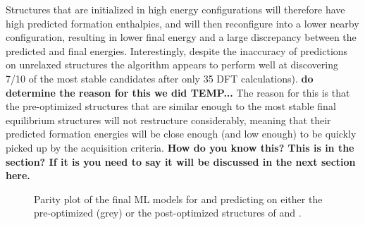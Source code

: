 %
Structures that are initialized in high energy configurations will therefore have high predicted formation enthalpies, and will then reconfigure into a lower nearby configuration, resulting in lower final energy and a large discrepancy between the predicted and final energies.
%
Interestingly, despite the inaccuracy of predictions on unrelaxed structures the algorithm appears to perform well at discovering \num{7/10} of the most stable candidates after only \num{35} DFT calculations). \textbf{do determine the reason for this we did TEMP...}
%
The reason for this is that the pre-optimized structures that are similar enough to the most stable final equilibrium structures will not restructure considerably, meaning that their predicted formation energies will be close enough (and low enough) to be quickly picked up by the acquisition criteria. \textbf{How do you know this?  This is in the section?  If it is you need to say it will be discussed in the next section here.}


\begin{figure}[!htb]
\centering
{}
\caption{\label{fig:parity}
%
Parity plot of the final ML models for \IrOtwo and \IrOthree predicting on either the pre-optimized (grey) or the post-optimized structures of \IrOtwo and \IrOthree.
}
\end{figure}
